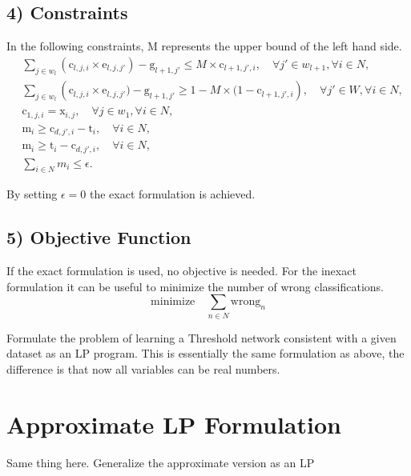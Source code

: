 \subsection*{4) Constraints}
In the following constraints, M represents the upper bound of the left hand side. %
\begin{align*}
    &\sum_{j \in w_l} \left(\text{c}_{l,j,i} \times \text{e}_{l,j,j'}\right) - \text{g}_{l+1,j'} \leq M \times \text{c}_{l+1,j',i}, \quad \forall j' \in w_{l+1}, \forall i \in N, \\
    &\sum_{j \in w_l} \left(\text{c}_{l,j,i} \times \text{e}_{l,j,j'}) - \text{g}_{l+1,j'} \geq 1 - M \times (1 - \text{c}_{l+1,j',i}\right), \quad \forall j' \in W, \forall i \in N, \\
    &\text{c}_{1,j,i} = \text{x}_{i,j}, \quad \forall j \in w_1, \forall i \in N, \\
    &\text{m}_i \geq \text{c}_{d,j',i} - \text{t}_i, \quad \forall i \in N, \\
    &\text{m}_i \geq \text{t}_i - \text{c}_{d,j',i}, \quad \forall i \in N, \\
    &\sum_{i \in N} m_i \leq \epsilon.
\end{align*}

By setting $\epsilon = 0$ the exact formulation is achieved. 


\subsection*{5) Objective Function}
If the exact formulation is used, no objective is needed. For the inexact formulation it can be useful to minimize the number of wrong classifications.
\begin{equation*}
    \text{minimize} \quad \sum_{n \in N} \text{wrong}_n
\end{equation*}

\begin{problem}
Formulate the problem of learning a Threshold network consistent with a given dataset as an LP program. This is essentially the same formulation as above, the difference is that now all variables can be real numbers. 
\end{problem}


\section{Approximate LP Formulation}

\begin{problem}
Same thing here. Generalize the approximate version as an LP
\end{problem}
